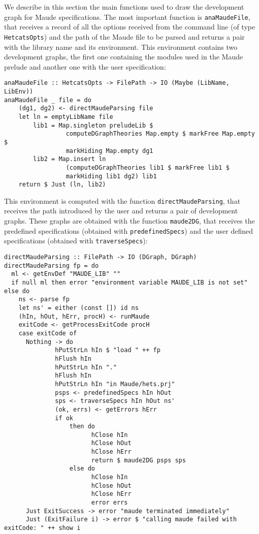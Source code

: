 
We describe in this section the main functions used to draw the
development graph for Maude specifications. The most important function is
\verb"anaMaudeFile", that receives a record of all the options received
from the command line (of type \verb"HetcatsOpts") and the path of
the Maude file to be parsed and returns a pair with the library
name and its environment. This environment contains two development
graphs, the first one containing the modules used in the Maude prelude
and another one with the user specification:

{\codesize
\begin{verbatim}
anaMaudeFile :: HetcatsOpts -> FilePath -> IO (Maybe (LibName, LibEnv))
anaMaudeFile _ file = do
    (dg1, dg2) <- directMaudeParsing file
    let ln = emptyLibName file
        lib1 = Map.singleton preludeLib $
                 computeDGraphTheories Map.empty $ markFree Map.empty $
                 markHiding Map.empty dg1
        lib2 = Map.insert ln
                 (computeDGraphTheories lib1 $ markFree lib1 $
                 markHiding lib1 dg2) lib1
    return $ Just (ln, lib2)
\end{verbatim}
}

This environment is computed with the function \verb"directMaudeParsing", that
receives the path introduced by the user and returns a pair of development graphs.
These graphs are obtained with the function \verb"maude2DG", that receives
the predefined specifications (obtained with \verb"predefinedSpecs")
and the user defined specifications (obtained with \verb"traverseSpecs"):

{\codesize
\begin{verbatim}
directMaudeParsing :: FilePath -> IO (DGraph, DGraph)
directMaudeParsing fp = do
  ml <- getEnvDef "MAUDE_LIB" ""
  if null ml then error "environment variable MAUDE_LIB is not set" else do
    ns <- parse fp
    let ns' = either (const []) id ns
    (hIn, hOut, hErr, procH) <- runMaude
    exitCode <- getProcessExitCode procH
    case exitCode of
      Nothing -> do
              hPutStrLn hIn $ "load " ++ fp
              hFlush hIn
              hPutStrLn hIn "."
              hFlush hIn
              hPutStrLn hIn "in Maude/hets.prj"
              psps <- predefinedSpecs hIn hOut
              sps <- traverseSpecs hIn hOut ns'
              (ok, errs) <- getErrors hErr
              if ok
                  then do
                        hClose hIn
                        hClose hOut
                        hClose hErr
                        return $ maude2DG psps sps
                  else do
                        hClose hIn
                        hClose hOut
                        hClose hErr
                        error errs
      Just ExitSuccess -> error "maude terminated immediately"
      Just (ExitFailure i) -> error $ "calling maude failed with exitCode: " ++ show i
\end{verbatim}
}

